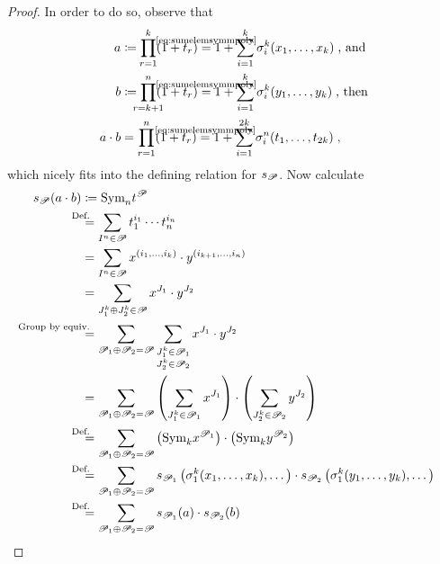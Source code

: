 \begin{Lem}
\begin{proof}
    In order to do so, observe that
    \begin{align*}
      a &\coloneqq
          \prod_{\mathclap{r=1}}^k(1+t_r)
          \cequalsby{\eqref{eq:sumelemsymmpoly}}
          1 + \sum_{i=1}^k \el i k(x_1,\dotsc,x_k)
          \;\text{, and}\\
      b &\coloneqq
          \prod_{\mathclap{r=k+1}}^n(1+t_r)
          \cequalsby{\eqref{eq:sumelemsymmpoly}}
          1 + \sum_{i=1}^k \el i k(y_1,\dotsc,y_k)
          \;\text{, then}\\
      a\cdot b
        &=
          \prod_{r=1}^n (1+t_r)
          \cequalsby{\eqref{eq:sumelemsymmpoly}}
          1 + \sum_{i=1}^{2k} \el i n (t_1,\dotsc,t_{2k})
          \;,
    \end{align*}
    which nicely fits into the defining relation for $s_{\mathscr{P}}$.
    Now calculate
    \begin{align*}
      \s{\Part}(a\cdot b)
      &\coloneqq
        \symm{n} t^{\Part}
      \\ &\equalsby{Def.}
           \sum_{I^n\in\Part}
           t_1^{i_1}\dotsm t_n^{i_n}
      \\ &=
           \sum_{I^n\in\Part}
           x^{(i_1,\dotsc,i_k)}\cdot y^{(i_{k+1},\dotsc,i_n)}
      \\ &=
           \sum_{J_1^k\concat J_2^k\in\Part}
           x^{J_1} \cdot y^{J_2}
      \\ &\equalsby{Group by equiv.}
           \sum_{\Part_1\concat \Part_2=\Part}
           \sum_{\substack{J_1^k\in\Part_1\\ J_2^k\in\Part_2}}
      x^{J_1} \cdot y^{J_2}
      \\ &=
           \sum_{\Part_1\concat \Part_2=\Part}
           \left(\sum_{J_1^k\in\Part_1} x^{J_1}\right)
           \cdot
           \left(\sum_{J_2^k\in\Part_2} y^{J_2}\right)
      \\ &\equalsby{Def.}
           \sum_{\Part_1\concat \Part_2=\Part}
           \left(\symm{k} x^{\Part_1}\right)
           \cdot
           \left(\symm{k} y^{\Part_2}\right)
      \\ &\equalsby{Def.}
           \sum_{\Part_1\concat \Part_2=\Part}
           \s{\Part_1}\left( \el 1 k(x_1,\dotsc,x_k),\dotsc \right)
           \cdot
           \s{\Part_2}\left( \el 1 k(y_1,\dotsc,y_k),\dotsc \right)
      \\ &\equalsby{Def.}
           \sum_{\Part_1\concat \Part_2=\Part}
           \s{\Part_1}(a) \cdot \s{\Part_2}(b)
           \qedhere
    \end{align*}
  \end{proof}
\end{Lem}

